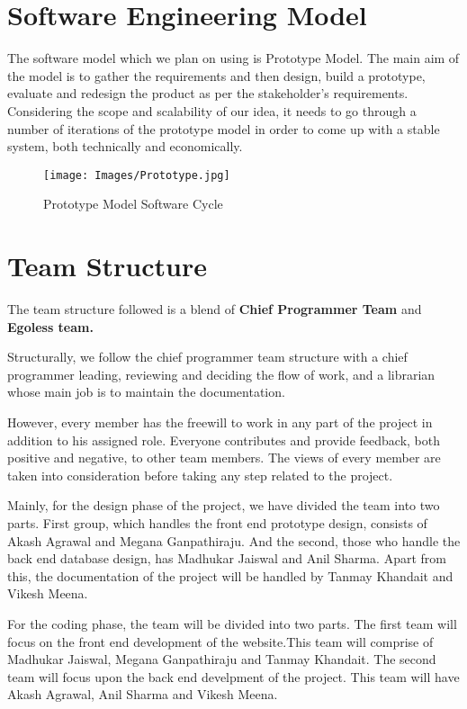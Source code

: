 \documentclass{article}
\begin{document}
\section{Software Engineering Model}
The software model which we plan on using is Prototype Model. The main aim of the model is to gather the requirements and then design, build a prototype, evaluate and redesign the product as per the stakeholder's requirements. 
Considering the scope and scalability of our idea, it needs to go through a number of iterations of the prototype model in order to come up with a stable system, both technically and economically.
  \begin{figure}[h!]
        \centering
        \texttt{[image: Images/Prototype.jpg]}
        \caption[Caption for LOF]{Prototype Model Software Cycle\footnotemark}
        \label{fig:my_label}
    \end{figure}

\section{Team Structure}
The team structure followed is a blend of \textbf{Chief Programmer Team} and \textbf{Egoless team.}
\par Structurally, we follow the chief programmer team structure with a chief programmer leading, reviewing and deciding the flow of work, and a librarian whose main job is to maintain the documentation.
\par However, every member has the freewill to work in any part of the project in addition to his assigned role. Everyone contributes and provide feedback, both positive and negative, to other team members. The views of every member are taken into consideration before taking any step related to the project.

\par Mainly, for the design phase of the project, we have divided the team into two parts. First group, which handles the front end prototype design, consists of Akash Agrawal and Megana Ganpathiraju. And the second, those who handle the back end database design, has Madhukar Jaiswal and Anil Sharma. Apart from this, the documentation of the project will be handled by Tanmay Khandait and Vikesh Meena.

\par For the coding phase, the team will be divided into two parts. The first team will focus on the front end development of the website.This team will comprise of Madhukar Jaiswal, Megana Ganpathiraju and Tanmay Khandait. The second team will focus upon the back end develpment of the project. This team will have Akash Agrawal, Anil Sharma and Vikesh Meena.
\end{document}
